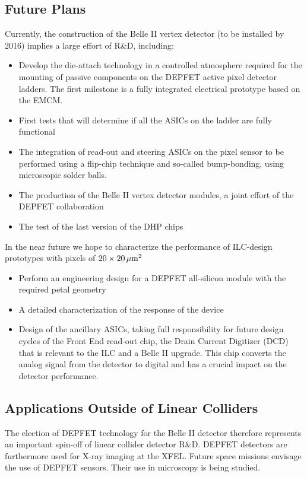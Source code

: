 \subsection{Future Plans}
Currently, the construction of the Belle II vertex detector (to be installed by 2016) implies a large effort of R\&D, including:
\begin{itemize}
\item Develop the die-attach technology in a controlled atmosphere required for the mounting of passive components on the DEPFET active pixel detector ladders. The first milestone is a fully integrated electrical prototype based on the EMCM.
\item First tests that will determine if all the ASICs on the ladder are fully functional
\item The integration of read-out and steering ASICs on the pixel sensor to be performed using a flip-chip technique and so-called bump-bonding, using microscopic solder balls.
\item The production of the Belle II vertex detector modules, a joint effort of the DEPFET collaboration
\item The test of the last version of the DHP chips
\end{itemize}
In the near future we hope to characterize the performance of ILC-design prototypes with
pixels of $20 \times \unit[20]{\micron^2}$
\begin{itemize}
\item Perform an engineering design for a DEPFET all-silicon module with the required petal geometry
\item A detailed characterization of the response of the device
\item Design of the ancillary ASICs, taking full responsibility for future design cycles of the Front End read-out chip, the Drain Current Digitizer (DCD) that is relevant to the ILC and a Belle II upgrade. This chip converts the analog signal from the detector to digital and has a crucial impact on the detector performance.
\end{itemize}
\subsection{Applications Outside of Linear Colliders}
The election of DEPFET technology for the Belle II detector therefore represents an important spin-off of linear collider detector R\&D. DEPFET detectors are furthermore used for X-ray imaging at the XFEL. Future space missions envisage the use of DEPFET sensors. Their use in microscopy is being studied.

